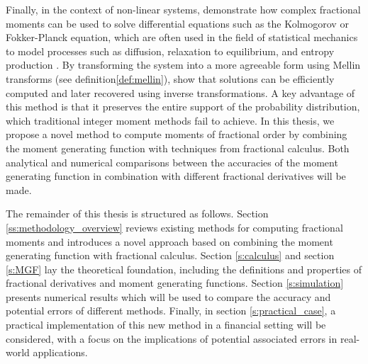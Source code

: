 Finally, in the context of non-linear systems, \cite{dimatteo2014} demonstrate how complex fractional moments can be used to solve differential equations such as the Kolmogorov or Fokker-Planck equation, which are often used in the field of statistical mechanics to model processes such as diffusion, relaxation to equilibrium, and entropy production \citep{schulten2005}. By transforming the system into a more agreeable form using Mellin transforms (see definition\ref{def:mellin}), \citet{dimatteo2014} show that solutions can be efficiently computed and later recovered using inverse transformations. A key advantage of this method is that it preserves the entire support of the probability distribution, which traditional integer moment methods fail to achieve.
\newline
In this thesis, we propose a novel method to compute moments of fractional order by combining the moment generating function with techniques from fractional calculus. Both analytical and numerical comparisons between the accuracies of the moment generating function in combination with different fractional derivatives will be made.  

The remainder of this thesis is structured as follows.
Section \ref{ss:methodology_overview} reviews existing methods for computing fractional moments and introduces a novel approach based on combining the moment generating function with fractional calculus. Section \ref{s:calculus} and section \ref{s:MGF} lay the theoretical foundation, including the definitions and properties of fractional derivatives and moment generating functions. Section \ref{s:simulation} presents numerical results which will be used to compare the accuracy and potential errors of different methods. Finally, in section \ref{s:practical_case}, a practical implementation of this new method in a financial setting will be considered, with a focus on the implications of potential associated errors in real-world applications.